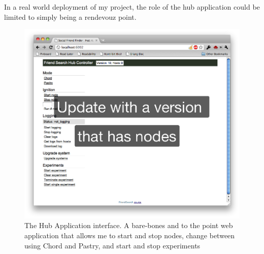 In a real world deployment of my project, the role of the hub application could be limited to simply being a rendevouz point.

\begin{figure}[htb]
\begin{center}
	\includegraphics[width=0.9\linewidth]{illustrations/HubApp.png}
\caption{The Hub Application interface. A bare-bones and to the point web application that allows me to start and stop nodes, change between using Chord and Pastry, and start and stop experiments}
\label{hubApp}
\end{center}
\end{figure}

